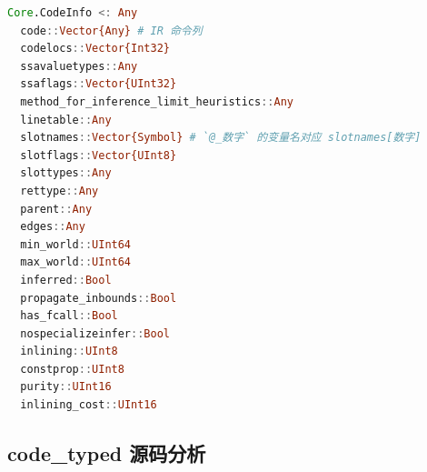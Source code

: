 \begin{lstlisting}[language=julia]
Core.CodeInfo <: Any
  code::Vector{Any} # IR 命令列
  codelocs::Vector{Int32}
  ssavaluetypes::Any
  ssaflags::Vector{UInt32}
  method_for_inference_limit_heuristics::Any
  linetable::Any
  slotnames::Vector{Symbol} # `@_数字` 的变量名对应 slotnames[数字]
  slotflags::Vector{UInt8}
  slottypes::Any
  rettype::Any
  parent::Any
  edges::Any
  min_world::UInt64
  max_world::UInt64
  inferred::Bool
  propagate_inbounds::Bool
  has_fcall::Bool
  nospecializeinfer::Bool
  inlining::UInt8
  constprop::UInt8
  purity::UInt16
  inlining_cost::UInt16
\end{lstlisting}

\subsection{code_typed 源码分析}
